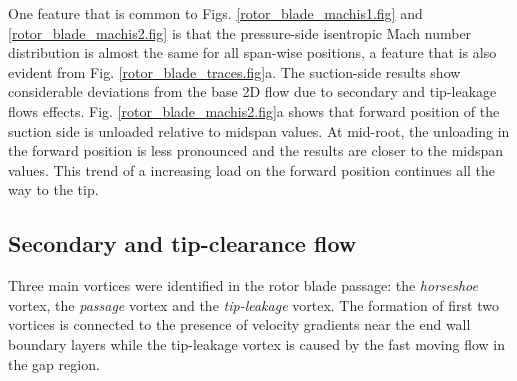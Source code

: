  One feature that is common to Figs. \ref{rotor_blade_machis1.fig}
 and \ref{rotor_blade_machis2.fig} is that the pressure-side isentropic
 Mach number distribution is almost the same for all span-wise
 positions, a feature that is also evident from Fig. \ref{rotor_blade_traces.fig}a.
 The suction-side results show considerable deviations from the base 2D flow
 due to secondary and tip-leakage flows effects.
 Fig. \ref{rotor_blade_machis2.fig}a shows that forward position of
 the suction side is unloaded relative to midspan values.
 At mid-root, the unloading in the forward position is less pronounced
 and the results are closer to the midspan values.
 This trend of a increasing load on the forward position continues all the way
 to the tip.
%
%
%
%
%
\subsection{Secondary and tip-clearance flow}
\label{rt27_secondaryflow.subsec}
%
 Three main vortices were identified in the rotor blade passage:
 the {\em horseshoe} vortex, the {\em passage} vortex and the
 {\em tip-leakage} vortex.
 The formation of first two vortices is connected to the presence
 of velocity gradients near the end wall boundary layers while
 the tip-leakage vortex is caused by the fast moving flow in the gap region.

